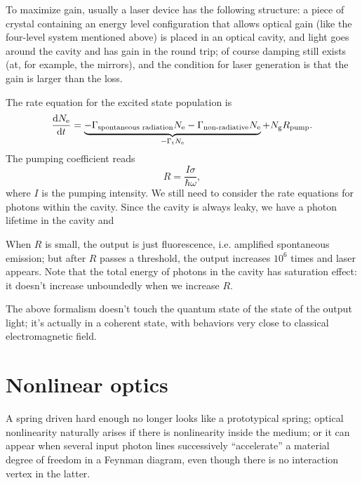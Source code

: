 \documentclass[hyperref, a4paper]{article}
\begin{document}
To maximize gain, usually a laser device has the following structure:
a piece of crystal containing an energy level configuration that allows optical gain 
(like the four-level system mentioned above)
is placed in an optical cavity,
and light goes around the cavity and has gain in the round trip;
of course damping still exists 
(at, for example, the mirrors),
and the condition for laser generation 
is that the gain is larger than the loss.

The rate equation for the excited state population is 
\begin{equation}
    \dv{N_{\text{e}}}{t} = 
    \underbrace{
        - \Gamma_{\text{spontaneous radiation}} N_{\text{e}}
        - \Gamma_{\text{non-radiative}} N_{\text{e}}
    }_{- \Gamma_{\text{t}} N_{\text{e}}}
    + N_{\text{g}} R_{\text{pump}}.
\end{equation}
The pumping coefficient reads 
\begin{equation}
    R = \frac{I \sigma}{\hbar \omega},
\end{equation} 
where $I$ is the pumping intensity.
We still need to consider the rate equations for photons within the cavity.
Since the cavity is always leaky, 
we have a photon lifetime in the cavity and 

When $R$ is small, the output is just fluorescence, 
i.e. amplified spontaneous emission;
but after $R$ passes a threshold, 
the output increases $10^6$ times and laser appears.
Note that the total energy of photons in the cavity 
has saturation effect: it doesn't increase unboundedly 
when we increase $R$.

The above formalism doesn't touch the quantum state of 
the state of the output light; 
it's actually in a coherent state,
with behaviors very close to classical electromagnetic field.


\section{Nonlinear optics}

A spring driven hard enough no longer looks like a prototypical spring;
optical nonlinearity naturally arises if there is nonlinearity inside the medium; 
or it can appear when several input photon lines 
successively ``accelerate'' a material degree of freedom
in a Feynman diagram,
even though there is no interaction vertex in the latter.
\end{document}
